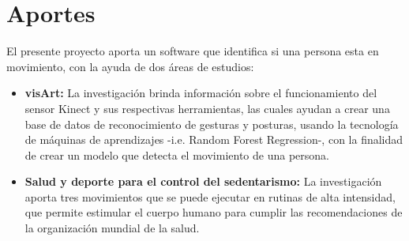 \section{Aportes}
El presente proyecto aporta un software que identifica si una persona esta en movimiento, con la ayuda de dos \'areas de estudios:
\begin{itemize}
	\item \textbf{\gls{visArt}:} La investigaci\'on brinda informaci\'on sobre el funcionamiento del sensor Kinect y sus respectivas herramientas, las cuales ayudan a crear una base de datos de reconocimiento de gesturas y posturas, usando la tecnolog\'ia de m\'aquinas de aprendizajes -i.e. Random Forest Regression-, con la finalidad de crear un modelo que detecta el movimiento de una persona.
	\item \textbf{Salud y deporte para el control del sedentarismo:} La investigaci\'on aporta tres movimientos que se puede ejecutar en rutinas de alta intensidad, que permite estimular el cuerpo humano para cumplir las recomendaciones de la organizaci\'on mundial de la salud.
\end{itemize}